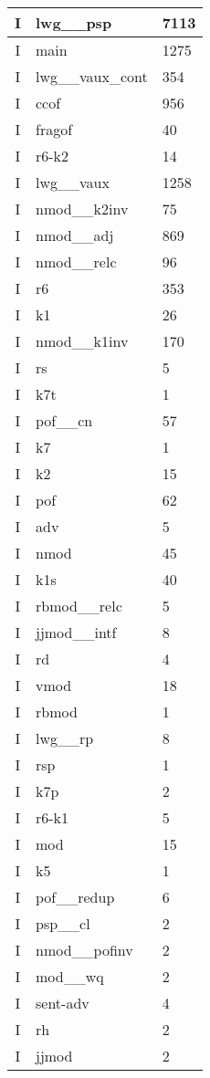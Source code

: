 \documentclass[a4 paper]{article}
\begin{document}
\begin{longtable}{cp{}p{}}
I & lwg\_\_psp & 7113\\ \midrule I & main & 1275\\ \midrule I & lwg\_\_vaux\_cont & 354\\ \midrule I & ccof & 956\\ \midrule I & fragof & 40\\ \midrule I & r6-k2 & 14\\ \midrule I & lwg\_\_vaux & 1258\\ \midrule I & nmod\_\_k2inv & 75\\ \midrule I & nmod\_\_adj & 869\\ \midrule I & nmod\_\_relc & 96\\ \midrule I & r6 & 353\\ \midrule I & k1 & 26\\ \midrule I & nmod\_\_k1inv & 170\\ \midrule I & rs & 5\\ \midrule I & k7t & 1\\ \midrule I & pof\_\_cn & 57\\ \midrule I & k7 & 1\\ \midrule I & k2 & 15\\ \midrule I & pof & 62\\ \midrule I & adv & 5\\ \midrule I & nmod & 45\\ \midrule I & k1s & 40\\ \midrule I & rbmod\_\_relc & 5\\ \midrule I & jjmod\_\_intf & 8\\ \midrule I & rd & 4\\ \midrule I & vmod & 18\\ \midrule I & rbmod & 1\\ \midrule I & lwg\_\_rp & 8\\ \midrule I & rsp & 1\\ \midrule I & k7p & 2\\ \midrule I & r6-k1 & 5\\ \midrule I & mod & 15\\ \midrule I & k5 & 1\\ \midrule I & pof\_\_redup & 6\\ \midrule I & psp\_\_cl & 2\\ \midrule I & nmod\_\_pofinv & 2\\ \midrule I & mod\_\_wq & 2\\ \midrule I & sent-adv & 4\\ \midrule I & rh & 2\\ \midrule I & jjmod & 2\\ \midrule 

\end{longtable}
\end{document}
